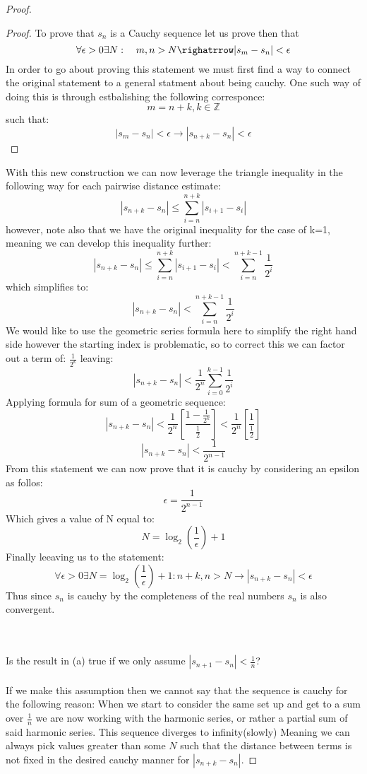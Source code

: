 \documentclass[11pt]{article}
\theoremstyle{definition}  %
\newcommand{\Z}{\mathbb{Z}}
\begin{document}
\begin{enumerate}
\begin{proof}
\begin{proof}
    To prove that $s_n$ is a Cauchy sequence let us prove then that \[
      \forall \epsilon>0 \exists N: \quad m,n>N \righatrrow |s_m-s_n|<\epsilon
    \]
    In order to go about proving this statement we must first find a way to connect the original statement to a general statment about being cauchy. One such way of doing this is through estbalishing the following corresponce:
    \[
      m=n+k, k \in \Z
    \]
    such that:
    \[
      |s_m-s_n|<\epsilon\rightarrow |s_{n+k}-s_n|<\epsilon
      \]
    \end{proof}
    With this new construction we can now leverage the triangle inequality in the following way for each pairwise distance estimate:
    \[
      |s_{n+k}-s_n|\leq \sum_{i=n}^{n+k}|s_{i+1}-s_i|
    \]
    however, note also that we have the original inequality for the case of k=1, meaning we can develop this inequality further:
    \[
      |s_{n+k}-s_n|\leq \sum_{i=n}^{n+k}|s_{i+1}-s_i|<\sum_{i=n}^{n+k-1}\frac{1}{2^i}
    \]
    which simplifies to:
    \[
      |s_{n+k}-s_n|<\sum_{i=n}^{n+k-1}\frac{1}{2^i}
    \]
    We would like to use the geometric series formula here to simplify the right hand side however the starting index is problematic, so to correct this we can factor out a term of: $\frac{1}{2^k}$ leaving:
    \[
      |s_{n+k}-s_n|<\frac{1}{2^n}\sum_{i=0}^{k-1}\frac{1}{2^i}
    \]
    Applying formula for sum of a geometric sequence:
    \[
        |s_{n+k}-s_n|<\frac{1}{2^n}\left[\frac{1-\frac{1}{2^k}}{\frac{1}{2}}\right]<\frac{1}{2^n}\left[\frac{1}{\frac{1}{2}}\right]
    \]
    \[
      |s_{n+k}-s_n|<\frac{1}{2^{n-1}}
    \]
    From this statement we can now prove that it is cauchy by considering an epsilon as follos:
    \[
      \epsilon=\frac{1}{2^{n-1}}
    \]
    Which gives a value of N equal to:
    \[
      N=\log_2(\frac{1}{\epsilon})+1
    \]
    Finally leeaving us to the statement:
    $$\forall \epsilon >0 \exists N=\log_2(\frac{1}{\epsilon})+1: n+k,n>N \rightarrow |s_{n+k}-s_n|<\epsilon$$
    Thus since $s_n$ is cauchy by the completeness of the real numbers $s_n$ is also convergent.\\\\
    \item\\
    Is the result in (a) true if we only assume $|s_{n+1}-s_n|<\frac{1}{n}$?
    \\\\ If we make this assumption then we cannot say that the sequence is cauchy for the following reason:
    When we start to consider the same set up and get to a sum over $\frac{1}{n}$ we are now working with the harmonic series, or rather a partial sum of said harmonic series. This sequence diverges to infinity(slowly) Meaning we can always pick values greater than some $N$ such that the distance between terms is not fixed in the desired cauchy manner for $|s_{n+k}-s_n|$.

\end{proof}
\end{enumerate}
\end{document}
